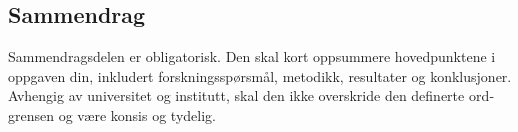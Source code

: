 \begin{otherlanguage}{norsk}
    \chapter{Sammendrag}
    Sammendragsdelen er obligatorisk. Den skal kort oppsummere hovedpunktene i oppgaven din, inkludert forskningsspørsmål, metodikk, resultater og konklusjoner. Avhengig av universitet og institutt, skal den ikke overskride den definerte ordgrensen og være konsis og tydelig.
\end{otherlanguage}